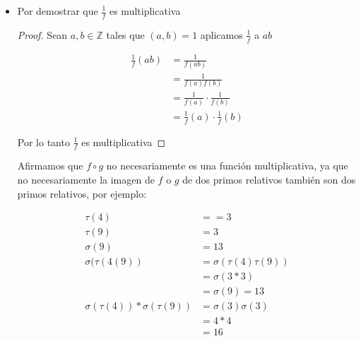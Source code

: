 \documentclass[12pt]{article}
\begin{document}
\begin{enumerate}
\begin{itemize}
            \begin{proof}
            Sean $a,b \in \mathbb{Z}$ tales que $(a,b) = 1$ aplicamos $fg$ a $ab$
            
            \begin{align*}
                fg(ab) &= f(ab)g(ab) \\
                       &= f(a)f(b)g(a)g(b) \\
                       &= (f(a)g(a))(f(b)g(b)) \\
                       &= fg(a)fg(b)
            \end{align*}
            
            Por lo tanto $fg$ es multiplicativa
            
            \end{proof}
            
            
            \item Por demostrar que $\frac{1}{f}$ es multiplicativa
            
            \begin{proof}
            Sean $a,b \in \mathbb{Z}$ tales que $(a,b) = 1$ aplicamos $\frac{1}{f}$ a $ab$ 
            
            \begin{align*}
                \frac{1}{f}(ab) &= \frac{1}{f(ab)} \\
                                &= \frac{1}{f(a)f(b)} \\
                                &= \frac{1}{f(a)} \cdot \frac{1}{f(b)} \\
                                &= \frac{1}{f}(a) \cdot \frac{1}{f}(b)
            \end{align*}
            
            
            Por lo tanto $\frac{1}{f}$ es multiplicativa
            
            \end{proof}
            
            
            Afirmamos que $f \circ g$ no necesariamente es una función multiplicativa, ya que no necesariamente la imagen de $f$ o $g$ de dos primos relativos también son dos primos relativos, por ejemplo:
            
            \begin{align*}
                \tau(4) &== 3 \\
                \tau(9) &= 3 \\
                \sigma(9) &= 13\\
                \sigma(\tau(4(9)) &= \sigma(\tau(4) \tau(9))\\
                                  &= \sigma(3 * 3) \\
                                  &= \sigma(9) = 13\\
                \sigma(\tau(4)) * \sigma(\tau(9)) &= \sigma(3) \sigma(3) \\
                                                  &= 4 * 4 \\
                                                  &= 16
            \end{align*}
            

\end{itemize}
\end{enumerate}
\end{document}
